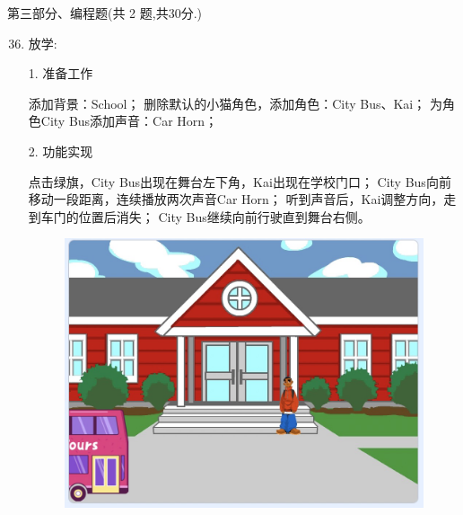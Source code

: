 \documentclass[10pt, a4paper]{article}
\begin{document}
    {\noindent\heiti 第三部分、编程题(共 2 题,共30分.)}
    \begin{enumerate}
        \setcounter{enumi}{35}
        
        \item 放学:
        
        1. 准备工作
        \begin{tasks}[label = (\arabic*)]
            \task 添加背景：School；
            \task 删除默认的小猫角色，添加角色：City Bus、Kai；
            \task 为角色City Bus添加声音：Car Horn；
        \end{tasks}
        2. 功能实现
        \begin{tasks}[label = (\arabic*)]
            \task 点击绿旗，City Bus出现在舞台左下角，Kai出现在学校门口；
            \task City Bus向前移动一段距离，连续播放两次声音Car Horn；
            \task 听到声音后，Kai调整方向，走到车门的位置后消失； 
            \task City Bus继续向前行驶直到舞台右侧。
        \end{tasks}
        \begin{figure}[htbp]
            \centering
            \begin{minipage}{.2\textwidth}
                \centering
                \includegraphics[width=\textwidth]{361.jpg}
            \end{minipage}
            \begin{minipage}{.2\textwidth}
                \centering

\end{minipage}
\end{figure}
\end{enumerate}
\end{document}
